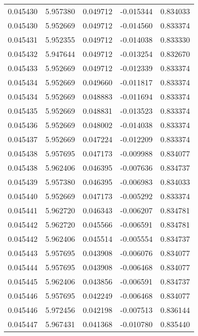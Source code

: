 \begin{tabular}{lrrrr}
0.045430    &  5.957380 &  0.049712 & -0.015344 &             0.834033 \\
0.045430    &  5.952669 &  0.049712 & -0.014560 &             0.833374 \\
0.045431    &  5.952355 &  0.049712 & -0.014038 &             0.833330 \\
0.045432    &  5.947644 &  0.049712 & -0.013254 &             0.832670 \\
0.045433    &  5.952669 &  0.049712 & -0.012339 &             0.833374 \\
0.045434    &  5.952669 &  0.049660 & -0.011817 &             0.833374 \\
0.045434    &  5.952669 &  0.048883 & -0.011694 &             0.833374 \\
0.045435    &  5.952669 &  0.048831 & -0.013523 &             0.833374 \\
0.045436    &  5.952669 &  0.048002 & -0.014038 &             0.833374 \\
0.045437    &  5.952669 &  0.047224 & -0.012209 &             0.833374 \\
0.045438    &  5.957695 &  0.047173 & -0.009988 &             0.834077 \\
0.045438    &  5.962406 &  0.046395 & -0.007636 &             0.834737 \\
0.045439    &  5.957380 &  0.046395 & -0.006983 &             0.834033 \\
0.045440    &  5.952669 &  0.047173 & -0.005292 &             0.833374 \\
0.045441    &  5.962720 &  0.046343 & -0.006207 &             0.834781 \\
0.045442    &  5.962720 &  0.045566 & -0.006591 &             0.834781 \\
0.045442    &  5.962406 &  0.045514 & -0.005554 &             0.834737 \\
0.045443    &  5.957695 &  0.043908 & -0.006076 &             0.834077 \\
0.045444    &  5.957695 &  0.043908 & -0.006468 &             0.834077 \\
0.045445    &  5.962406 &  0.043856 & -0.006591 &             0.834737 \\
0.045446    &  5.957695 &  0.042249 & -0.006468 &             0.834077 \\
0.045446    &  5.972456 &  0.042198 & -0.007513 &             0.836144 \\
0.045447    &  5.967431 &  0.041368 & -0.010780 &             0.835440 \\

\end{tabular}

